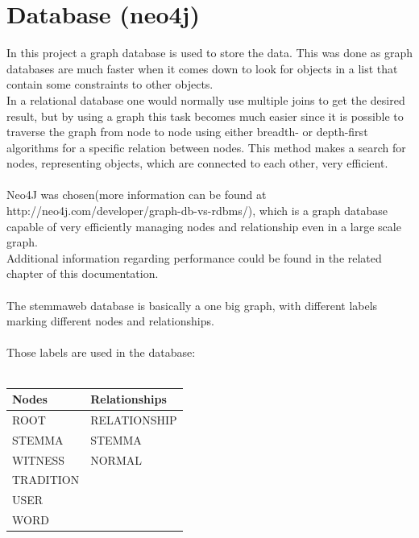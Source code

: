 \documentclass[11pt,fleqn,openany]{book} %
\begin{document}


\chapter{Database (neo4j)}

In this project a graph database is used to store the data. This was done as graph databases are much faster when it comes down to look for objects in a list that contain some constraints to other objects. \\ In a relational database one would normally use multiple joins to get the desired result, but by using a graph this task becomes much easier since it is possible to traverse the graph from node to node using either breadth- or depth-first algorithms for a specific relation between nodes. This method makes a search for nodes, representing objects, which are connected to each other, very efficient. \\ \quad \\ Neo4J was chosen(more information can be found at http://neo4j.com/developer/graph-db-vs-rdbms/), which is a graph database capable of very efficiently managing nodes and relationship even in a large scale graph.\\
Additional information regarding performance could be found in the related chapter of this documentation. \\ \quad \\The stemmaweb database is basically a one big graph, with different labels marking different nodes and relationships. \\ \quad \\Those labels are used in the database:\\ \quad \\
\begin{tabular}{|l|l|}
\hline 
\textbf{Nodes} & \textbf{Relationships} \\ 
\hline 
ROOT & RELATIONSHIP \\ 
\hline 
STEMMA & STEMMA \\ 
\hline 
WITNESS & NORMAL \\ 
\hline 
TRADITION &  \\ 
\hline 
USER &  \\ 
\hline 
WORD &  \\ 
\hline 
\end{tabular} \\\\
\end{document}
